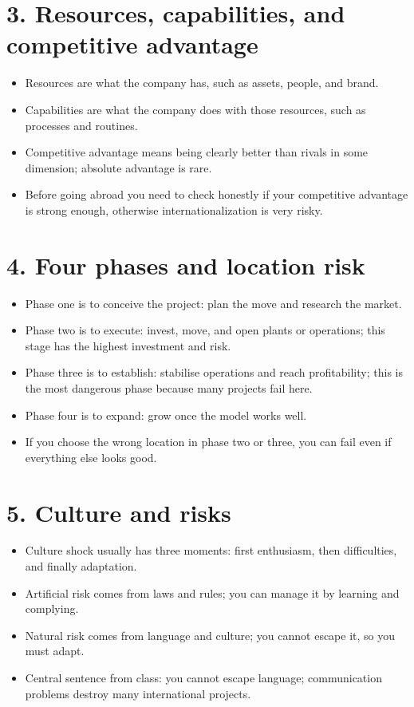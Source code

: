 \documentclass[10pt,a4paper]{article}
\begin{document}
\section*{3. Resources, capabilities, and competitive advantage}
\begin{itemize}
\item Resources are what the company has, such as assets, people, and brand.
\item Capabilities are what the company does with those resources, such as processes and routines.
\item Competitive advantage means being clearly better than rivals in some dimension; absolute advantage is rare.
\item Before going abroad you need to check honestly if your competitive advantage is strong enough, otherwise internationalization is very risky.
\end{itemize}

\section*{4. Four phases and location risk}
\begin{itemize}
\item Phase one is to conceive the project: plan the move and research the market.
\item Phase two is to execute: invest, move, and open plants or operations; this stage has the highest investment and risk.
\item Phase three is to establish: stabilise operations and reach profitability; this is the most dangerous phase because many projects fail here.
\item Phase four is to expand: grow once the model works well.
\item If you choose the wrong location in phase two or three, you can fail even if everything else looks good.
\end{itemize}

\section*{5. Culture and risks}
\begin{itemize}
\item Culture shock usually has three moments: first enthusiasm, then difficulties, and finally adaptation.
\item Artificial risk comes from laws and rules; you can manage it by learning and complying.
\item Natural risk comes from language and culture; you cannot escape it, so you must adapt.
\item Central sentence from class: you cannot escape language; communication problems destroy many international projects.
\end{itemize}
\end{document}
